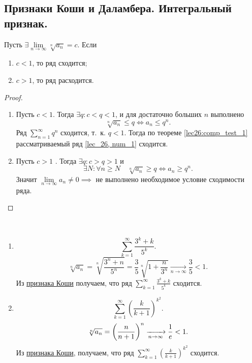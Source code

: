 \documentclass[../../main.tex]{subfiles}
\begin{document}
	\subsection{Признаки Коши и Даламбера. Интегральный признак.}
	
	\begin{thm}\label{lec27:cauchy} 	
		Пусть $\exists \lim\limits_{n \to \infty } \sqrt[n]{a_n}  = c$. Если
	\begin{enumerate}[label={\alph*)}]
			\item $c < 1$, то ряд сходится;
			\item $c > 1$, то ряд расходится.
	\end{enumerate}
	\end{thm}
	\begin{proof}
		
		~
		
	\begin{enumerate}[label={\alph*)}]
		 \item Пусть $c < 1$. Тогда $\exists q: c < q < 1$, и для достаточно больших 
		 $n$ выполнено
			\[ \sqrt[n]{a_n} \leq q \iff a_n \leq q^n. \]
			Ряд $\sum\limits_{n=1}^{\infty} q^n$ сходится, т.~к. $q < 1$. Тогда по 
			теореме \ref{lec26:comp_test_1}
			рассматриваемый ряд \eqref{lec_26, num_1} сходится.
			 
		\item Пусть $c>1$ . Тогда $\exists q : c > q > 1 $ и \[\exists N : \forall n 
		\geq N \quad
			 \sqrt[n]{a_n} \geq q \iff a_n \geq q^n.\] Значит $\lim\limits_{n \to 
			 \infty} a_n 
			 \neq 0 \implies$ не выполнено необходимое условие сходимости ряда. \qedhere
	\end{enumerate}
	\end{proof}

	\begin{examples}

	~

	\begin{enumerate}
	 \item
		\[ \sum_{k=1}^{\infty}  \frac{3^k + k}{5^k}.  \]
		\[ \sqrt[n]{a_n} = \sqrt[n]{\frac{3^n + n}{5^n}} = \frac{3}{5} \sqrt[n]{1 + 
		\frac{n}{3^n}}  \underset{n \rightarrow \infty}
		{\longrightarrow} \frac{3}{5} < 1.    \]
		Из \hyperref[lec27:cauchy]{признака Коши} получаем, что ряд  
		$\sum\limits_{k=1}^{\infty}  \frac{3^k + k}{5^k}$
		сходится.
	\item
		\[ \sum_{k=1}^{\infty} \left( \frac{k}{k+1}\right) ^{k^2}. \]
		\[ \sqrt[n]{a_n} =  \left( \frac{n}{n+1}\right) ^n  \xrightarrow[n \rightarrow 
		\infty]{} \frac{1}{e} < 1. \]
		Из \hyperref[lec27:cauchy]{признака Коши}, получаем, что ряд 
		$\sum\limits_{k=1}^{\infty} \left( \frac{k}{k+1}\right) ^{k^2}$ сходится.
	\end{enumerate}
	\end{examples} 	
\end{document}

